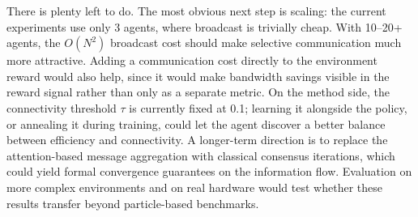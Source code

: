 \documentclass[letterpaper, 10 pt, journal, twoside]{IEEEtran}
\begin{document}
There is plenty left to do. The most obvious next step is scaling: the current experiments use only 3 agents, where broadcast is trivially cheap. With 10--20+ agents, the $O(N^2)$ broadcast cost should make selective communication much more attractive. Adding a communication cost directly to the environment reward would also help, since it would make bandwidth savings visible in the reward signal rather than only as a separate metric. On the method side, the connectivity threshold $\tau$ is currently fixed at 0.1; learning it alongside the policy, or annealing it during training, could let the agent discover a better balance between efficiency and connectivity. A longer-term direction is to replace the attention-based message aggregation with classical consensus iterations, which could yield formal convergence guarantees on the information flow. Evaluation on more complex environments and on real hardware would test whether these results transfer beyond particle-based benchmarks.



\end{document}
